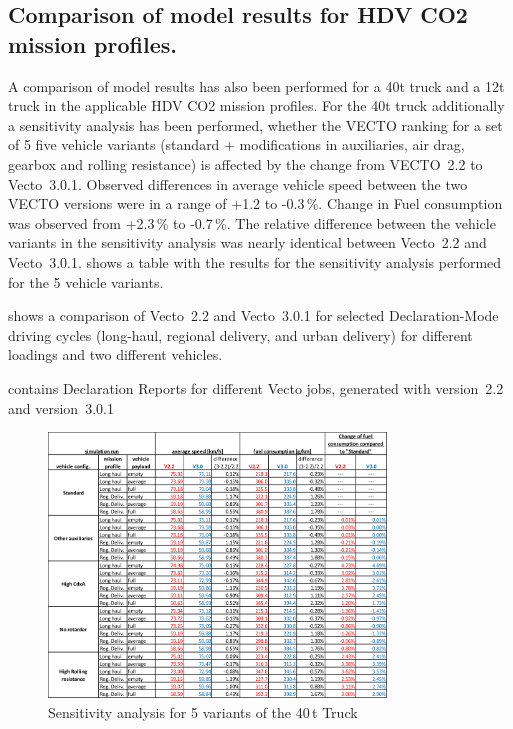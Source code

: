 \subsection{Comparison of model results for HDV CO2 mission profiles.} %
\label{sub:comparison_of_model_results_for_hdv_co2_mission_profiles_}

A comparison of model results has also been performed for a 40t truck and a 12t truck in the applicable HDV CO2 mission profiles. For the 40t truck additionally a sensitivity analysis has been performed, whether the VECTO ranking for a set of 5 five vehicle variants (standard + modifications in auxiliaries, air drag, gearbox and rolling resistance) is affected by the change from VECTO~2.2 to Vecto~3.0.1.
Observed differences in average vehicle speed between the two VECTO versions were in a range of +1.2 to -0.3\,\%. Change in Fuel consumption was observed from +2.3\,\% to -0.7\,\%. The relative difference between the vehicle variants in the sensitivity analysis was nearly identical between Vecto~2.2 and Vecto~3.0.1.  shows a table with the results for the sensitivity analysis performed for the 5 vehicle variants.





 shows a comparison of Vecto~2.2 and Vecto~3.0.1 for selected Declaration-Mode driving cycles (long-haul, regional delivery, and urban delivery) for different loadings and two different vehicles.

 contains Declaration Reports for different Vecto jobs, generated with version~2.2 and version~3.0.1

\begin{figure}
	\centering
	\includegraphics[width=0.8\textwidth]{img/SensitivityAnalysis.png}
	\caption{Sensitivity analysis for 5 variants of the 40\,t Truck}
	\label{fig:sensitivity_analysis_40t_Truck}
\end{figure}


